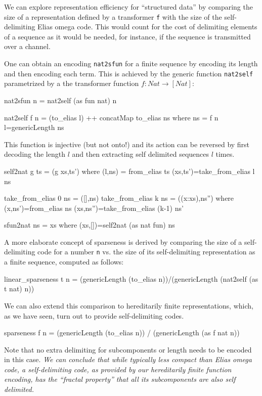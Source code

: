\documentclass[]{INCLUDES/llncs}
\begin{document}
We can explore representation efficiency for ``structured data'' by comparing
the size of a representation defined by a transformer {\tt f} with the size of
the self-delimiting Elias omega code. This would count for the cost of
delimiting elements of a sequence as it would be needed, for instance, if the
sequence is transmitted over a channel.

One can obtain an encoding {\tt nat2sfun} for a finite sequence by
encoding its length and then encoding each term. This is achieved by the
generic function {\tt nat2self} parametrized by a the transformer function
$f:Nat \rightarrow [Nat]$:
\begin{code}
nat2sfun n = nat2self (as fun nat) n   

nat2self f n = (to_elias l) ++ concatMap to_elias ns where
  ns = f n
  l=genericLength ns
\end{code}
This function is injective (but not onto!) and its action can be reversed
by first decoding the length $l$ and then extracting self delimited sequences 
$l$ times.
\begin{code}
self2nat g ts = (g xs,ts') where 
  (l,ns) = from_elias ts
  (xs,ts')=take_from_elias l ns

  take_from_elias 0 ns = ([],ns) 
  take_from_elias k ns = ((x:xs),ns'') where
     (x,ns')=from_elias ns
     (xs,ns'')=take_from_elias (k-1) ns'
  
sfun2nat ns = xs where (xs,[])=self2nat (as nat fun) ns
\end{code}

A more elaborate concept of sparseness is derived by comparing the size of a
self-delimiting code for a number {\tt n} vs. the size of its
self-delimiting representation as a finite sequence,
computed as follows:
\begin{code}
linear_sparseness t n = 
  (genericLength (to_elias n))/(genericLength (nat2self (as t nat) n))
\end{code}

We can also extend this comparison to hereditarily finite representations,
which, as we have seen,  turn out to provide self-delimiting codes.
\begin{code}
sparseness f n = 
  (genericLength (to_elias n)) / (genericLength (as f nat n))
\end{code}
Note that no extra delimiting for subcomponents or length needs to be encoded
in this case. {\em We can conclude that while typically less compact than Elias
omega code, a self-delimiting code, as provided by our hereditarily finite function encoding, 
has the ``fractal property'' that all its subcomponents are also self
delimited.}
\end{document}
